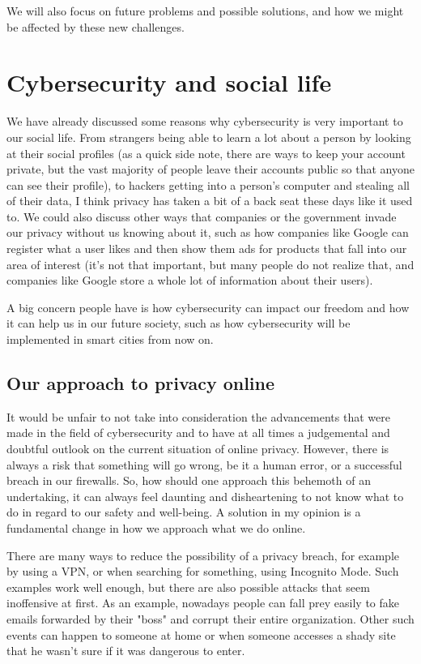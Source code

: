 \documentclass[a4paper,12pt]{report}
\begin{document}
We will also focus on future problems and possible solutions, and how we might be affected by these new challenges.

\chapter{Cybersecurity and social life}

We have already discussed some reasons why cybersecurity is very important to our social life. From strangers being able to learn a lot about a person by looking at their social profiles (as a quick side note, there are ways to keep your account private, but the vast majority of people leave their accounts public so that anyone can see their profile), to hackers getting into a person's computer and stealing all of their data, I think privacy has taken a bit of a back seat these days like it used to. We could also discuss other ways that companies or the government invade our privacy without us knowing about it, such as how companies like Google can register what a user likes and then show them ads for products that fall into our area of interest (it's not that important, but many people do not realize that, and companies like Google store a whole lot of information about their users).

A big concern people have is how cybersecurity can impact our freedom and how it can help us in our future society, such as how cybersecurity will be implemented in smart cities from now on.

\section{Our approach to privacy online}

It would be unfair to not take into consideration the advancements that were made in the field of cybersecurity and to have at all times a judgemental and doubtful outlook on the current situation of online privacy. However, there is always a risk that something will go wrong, be it a human error, or a successful breach in our firewalls. So, how should one approach this behemoth of an undertaking, it can always feel daunting and disheartening to not know what to do in regard to our safety and well-being. A solution in my opinion is a fundamental change in how we approach what we do online. 

There are many ways to reduce the possibility of a privacy breach, for example by using a VPN, or when searching for something, using Incognito Mode. Such examples work well enough, but there are also possible attacks that seem inoffensive at first. As an example, nowadays people can fall prey easily to fake emails forwarded by their "boss" and corrupt their entire organization. Other such events can happen to someone at home or when someone accesses a shady site that he wasn't sure if it was dangerous to enter.
\end{document}
